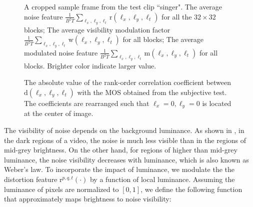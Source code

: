 \documentclass{sig-alternate}
\begin{document}
\begin{figure}[htp]
{\label{fig:m_feature}}
\caption{\label{fig:noise_visibility} A cropped sample frame from the test clip ``singer".  The average noise feature $\frac{1}{B^2T}\sum_{\ell_x,\ell_y,\ell_t}\mathrm{r}(\ell_x,\ell_y,\ell_t)$ for all the $32\times32$ blocks;
 The average visibility modulation factor $\frac{1}{B^2T}\sum_{\ell_x,\ell_y,\ell_t}\mathrm{w}(\ell_x,\ell_y,\ell_t)$ for all blocks;
 The average modulated noise feature $\frac{1}{B^2T}\sum_{\ell_x,\ell_y,\ell_t}\mathrm{m}(\ell_x,\ell_y,\ell_t)$ for all blocks. Brighter color indicate larger value.
} 
\end{figure}

\begin{figure}
\caption{\label{fig:correlation_map}The absolute value of the rank-order correlation coefficient between $\mathrm{d}(\ell_x,\ell_y,\ell_t)$ with the MOS obtained from the subjective test. The coefficients are rearranged such that $\ell_x=0,\ell_y=0$ is located at the center of image.}
\end{figure}
The visibility of noise depends on the background luminance. As shown in \cite{ChoLi1995,Gir1989}, in the dark regions of a video, the noise is much less visible than in the regions of mid-grey brightness. On the other hand, for regions of higher than mid-grey luminance, the noise visibility decreases with luminance, which is also known as Weber's law. To incorporate the impact of luminance, we modulate the the distortion feature $\mathrm{r}^{p,q,t}(\cdot)$ by a function of local luminance. Assuming the luminance of pixels are normalized to $[0,1]$, we define the following function that approximately maps brightness to noise visibility: 
\end{document}
